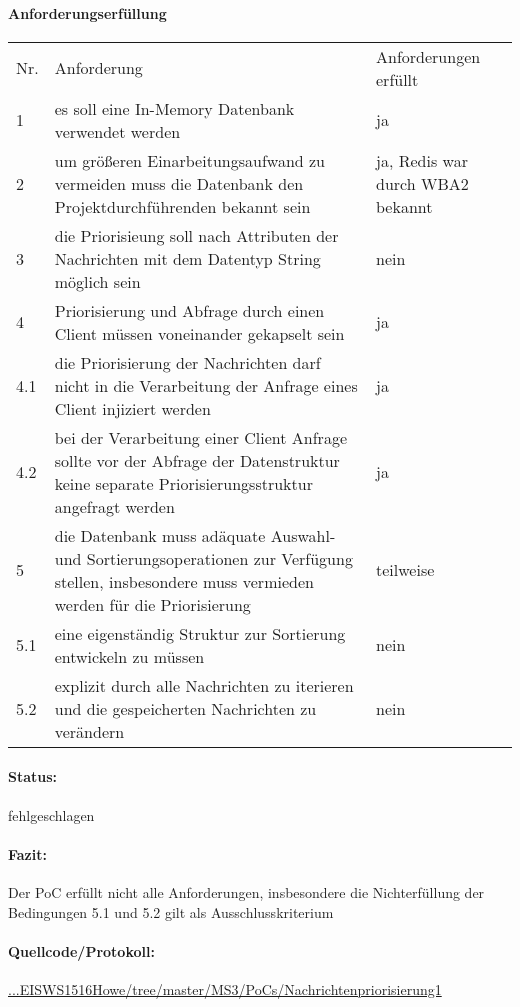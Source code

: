 \documentclass[11pt,oneside,a4paper,notitlepage]{article}
\begin{document}
\paragraph*{Anforderungserfüllung}
\begin{center}
\begin{tabular}{| p{20mm} | p{80mm} | p{60mm} |}
\hline
Nr. & Anforderung & Anforderungen erfüllt\\
1 & es soll eine In-Memory Datenbank verwendet werden & ja \\
2 & um größeren Einarbeitungsaufwand zu vermeiden muss die Datenbank den Projektdurchführenden bekannt sein & ja, Redis war durch WBA2 bekannt \\
3 & die Priorisieung soll nach Attributen der Nachrichten mit dem Datentyp String möglich sein & nein\\
4 & Priorisierung und Abfrage durch einen Client müssen voneinander gekapselt sein & ja\\
4.1 & die Priorisierung der Nachrichten darf nicht in die Verarbeitung der Anfrage eines Client injiziert werden & ja \\
4.2 & bei der Verarbeitung einer Client Anfrage sollte vor der Abfrage der Datenstruktur keine separate Priorisierungsstruktur angefragt werden & ja\\
5 & die Datenbank muss adäquate Auswahl- und Sortierungsoperationen zur Verfügung stellen, insbesondere muss vermieden werden für die Priorisierung & teilweise \\
5.1 & eine eigenständig Struktur zur Sortierung entwickeln zu müssen & nein \\
5.2 & explizit durch alle Nachrichten zu iterieren und die gespeicherten Nachrichten zu verändern & nein \\
\hline
\end{tabular}
\end{center}
%
\paragraph*{Status:} fehlgeschlagen
\paragraph*{Fazit:} Der PoC erfüllt nicht alle Anforderungen, insbesondere die Nichterfüllung der Bedingungen 5.1 und 5.2 gilt als Ausschlusskriterium
\paragraph*{Quellcode/Protokoll: } \href{https://github.com/thuascgn/EISWS1516Howe/tree/master/MS3/PoCs/Nachrichtenpriorisierung1}{...EISWS1516Howe/tree/master/MS3/PoCs/Nachrichtenpriorisierung1}
\end{document}
